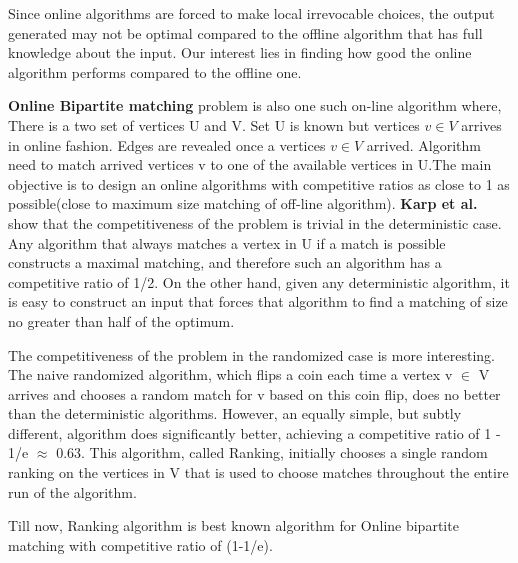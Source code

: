 \documentclass[conference,compsoc]{IEEEtran}
\begin{document}
Since online algorithms are forced to make local irrevocable choices, the output generated may not be optimal compared to the offline algorithm that has full knowledge about the input. Our interest lies in finding how good the online algorithm performs compared to the offline one. \par
\textbf{Online Bipartite matching} problem is also one such on-line algorithm where, There is a two set of vertices U and V. Set U is known but vertices $ v \in V $ arrives in online fashion. Edges are revealed once a vertices $ v \in V $ arrived. Algorithm need to match arrived vertices v to one of the available vertices in U.The main objective is to design an online algorithms with competitive ratios as close to 1 as possible(close to maximum size matching of off-line algorithm).
\textbf{Karp et al.} show that the competitiveness of the problem is trivial in the deterministic case. Any algorithm that always matches a vertex in U if a match is possible constructs a maximal matching, and therefore such an algorithm has a competitive ratio of 1/2. On the other hand, given any deterministic algorithm, it is easy to construct an input that forces that algorithm to find a matching of size no greater than half of the optimum.\par
The competitiveness of the problem in the randomized case is more interesting. The naive randomized algorithm, which flips a coin each time a vertex v $ \in $ V arrives and chooses a random match for v based on this coin flip, does no better than the deterministic algorithms.
However, an equally simple, but subtly different, algorithm does significantly better, achieving a competitive ratio of 1 - 1/e $ \approx $ 0.63. This algorithm, called Ranking, initially chooses a single random ranking  on the vertices in V that is used to choose matches throughout the entire run of the algorithm.\par
Till now, Ranking algorithm is best known algorithm for Online bipartite matching with competitive ratio of (1-1/e).





 
\end{document}
